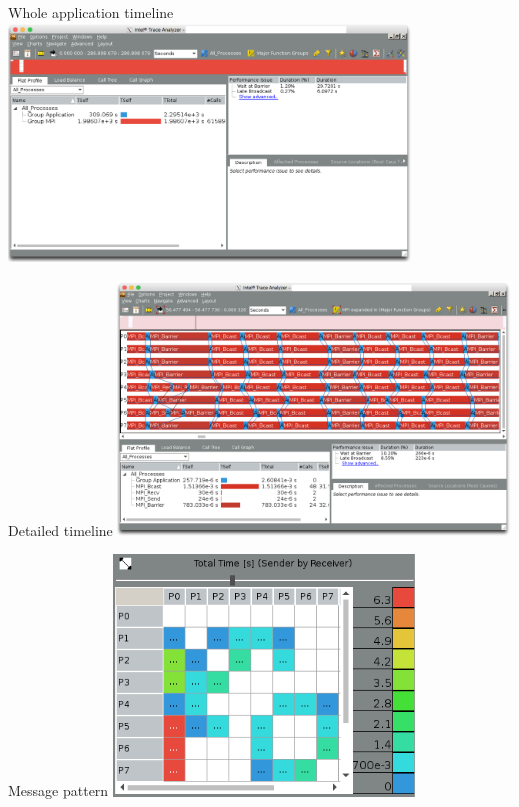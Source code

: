 \documentclass[handout]{beamer}
\begin{document}
\begin{frame}{Whole application timeline}
	\centering
	\includegraphics[width=0.8\textwidth]{figs/overview-timeline}
\end{frame}

\begin{frame}{Detailed timeline}
	\centering
	\includegraphics[width=0.78\textwidth]{figs/detailed-timeline}
\end{frame}

\begin{frame}{Message pattern}
	\centering
	\includegraphics[width=0.6\textwidth]{figs/message-pattern}
\end{frame}
\end{document}
